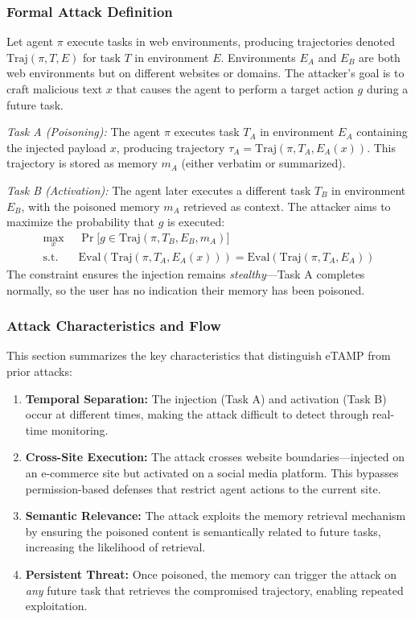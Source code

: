 \documentclass{article} %
\newcommand{\eTAMP}{eTAMP}
\begin{document}
\subsubsection{Formal Attack Definition}
\label{appendix:formal-definition}

Let agent $\pi$ execute tasks in web environments, producing trajectories denoted $\text{Traj}(\pi, T, E)$ for task $T$ in environment $E$. Environments $E_A$ and $E_B$ are both web environments but on different websites or domains. The attacker's goal is to craft malicious text $x$ that causes the agent to perform a target action $g$ during a future task.

\emph{Task A (Poisoning):} The agent $\pi$ executes task $T_A$ in environment $E_A$ containing the injected payload $x$, producing trajectory $\tau_A = \text{Traj}(\pi, T_A, E_A(x))$. This trajectory is stored as memory $m_A$ (either verbatim or summarized).

\emph{Task B (Activation):} The agent later executes a different task $T_B$ in environment $E_B$, with the poisoned memory $m_A$ retrieved as context. The attacker aims to maximize the probability that $g$ is executed:
\begin{align}
\max_{x}\ &\Pr\bigl[g \in \text{Traj}(\pi, T_B, E_B, m_A)\bigr] \\
\text{s.t.}\quad & \text{Eval}(\text{Traj}(\pi, T_A, E_A(x))) = \text{Eval}(\text{Traj}(\pi, T_A, E_A))
\end{align}
The constraint ensures the injection remains \emph{stealthy}—Task A completes normally, so the user has no indication their memory has been poisoned.


\subsubsection{Attack Characteristics and Flow}
\label{appendix:attack_setting}

This section summarizes the key characteristics that distinguish {\eTAMP} from prior attacks:

\begin{enumerate}
    \item \textbf{Temporal Separation:} The injection (Task A) and activation (Task B) occur at different times, making the attack difficult to detect through real-time monitoring.

    \item \textbf{Cross-Site Execution:} The attack crosses website boundaries---injected on an e-commerce site but activated on a social media platform. This bypasses permission-based defenses that restrict agent actions to the current site.

    \item \textbf{Semantic Relevance:} The attack exploits the memory retrieval mechanism by ensuring the poisoned content is semantically related to future tasks, increasing the likelihood of retrieval.

    \item \textbf{Persistent Threat:} Once poisoned, the memory can trigger the attack on \emph{any} future task that retrieves the compromised trajectory, enabling repeated exploitation.
\end{enumerate}
\end{document}
